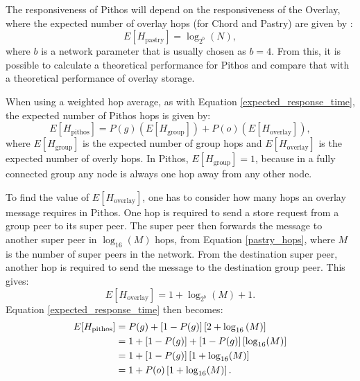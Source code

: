 The responsiveness of Pithos will depend on the responsiveness of the Overlay, where the expected number of overlay hops (for Chord and Pastry) are given by \cite{storage_and_chaching_PAST}:
%
\begin{equation}\label{pastry_hops}
    E[H_{\textrm{pastry}}] = \log_{2^b}\left(N\right),
\end{equation}
%
where $b$ is a network parameter that is usually chosen as $b = 4$. From this, it is possible to calculate a theoretical performance for Pithos and
compare that with a theoretical performance of overlay storage.

When using a weighted hop average, as with Equation \eqref{expected_response_time}, the expected number of Pithos hops is given by:
%
\begin{equation}\label{expected_response_time}
    E[H_{\textrm{pithos}}] = P(g)\left(E\left[H_{\textrm{group}}\right]\right) + P(o)\left(E\left[H_{\textrm{overlay}}\right]\right),
\end{equation}
%
where $E\left[H_{\textrm{group}}\right]$ is the expected number of group hops and $E\left[H_{\textrm{overlay}}\right]$ is the expected number of
overly hops. In Pithos, $E\left[H_{\textrm{group}}\right] = 1$, because in a fully connected group any node is always one hop away from any other
node.

To find the value of $E\left[H_{\textrm{overlay}}\right]$, one has to consider how many hops an overlay message requires in Pithos. One hop is
required to send a store request from a group peer to its super peer. The super peer then forwards the message to another super peer in
$\log_{16}(M)$ hops, from Equation \eqref{pastry_hops}, where $M$ is the number of super peers in the network. From the destination super peer,
another hop is required to send the message to the destination group peer. This gives:
%
\begin{equation}\label{group_hops}
    E\left[H_{\textrm{overlay}}\right] = 1 + \log_{2^b}(M) + 1.
\end{equation}
%
Equation \eqref{expected_response_time} then becomes:
%
\begin{align}
E[H_{\textrm{pithos}}] &= P(g) + \left[1 - P(g)\right]\left[2 + \log_{16}\left(M\right)\right]\notag\\
                       &= 1 + \left[1 - P(g)\right] + \left[1 - P(g)\right]\left[\log_{16}(M)\right]\notag\\
                       &= 1 + \left[1 - P(g)\right]\left[1 + \log_{16}(M)\right]\notag\\
                       &= 1 + P(o)\left[1 + \log_{16}(M)\right].\label{expected_response_time_exp}
\end{align}

